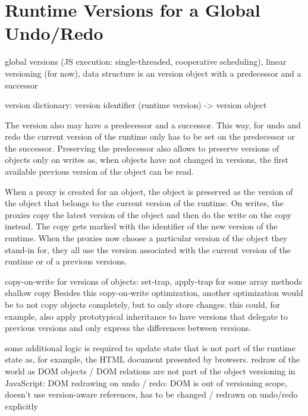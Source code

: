 \section{Runtime Versions for a Global Undo/Redo} \label{sec:IMPLEMENTATION:3}


global versions (JS execution: single-threaded, cooperative scheduling), linear versioning (for now), data structure is an version object with a predecessor and a successor

version dictionary: version identifier (runtime version) -> version object

The version also may have a predecessor and a successor.
This way, for undo and redo the current version of the runtime only has to be set on the predecessor or the successor.
Preserving the predecessor also allows to preserve versions of objects only on writes as, when objects have not changed in versions, the first available previous version of the object can be read.



When a proxy is created for an object, the object is preserved as the version of the object that belongs to the current version of the runtime.
On writes, the proxies copy the latest version of the object and then do the write on the copy instead.
The copy gets marked with the identifier of the new version of the runtime.
When the proxies now choose a particular version of the object they stand-in for, they all use the version associated with the current version of the runtime or of a previous versions.

copy-on-write for versions of objects: set-trap, apply-trap for some array methods
shallow copy
Besides this copy-on-write optimization, another optimization would be to not copy objects completely, but to only store changes.
this could, for example, also apply prototypical inheritance to have versions that delegate to previous versions and only express the differences between versions.



some additional logic is required to update state that is not part of the runtime state as, for example, the HTML document presented by browsers.
redraw of the world as DOM objects / DOM relations are not part of the object versioning in JavaScript: DOM redrawing on undo / redo: DOM is out of versioning scope, doesn’t use version-aware references, has to be changed / redrawn on undo/redo explicitly




